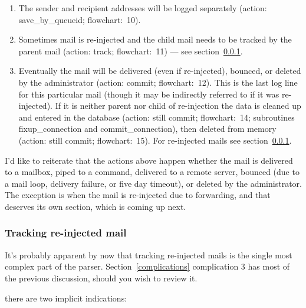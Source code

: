 \documentclass[a4paper,12pt,draft]{article}
\begin{document}
\begin{enumerate}

    \item The sender and recipient addresses will be logged separately
        (action: save\_by\_queueid; flowchart:~10).

    \item Sometimes mail is re-injected and the child mail needs to be
        tracked by the parent mail (action: track; flowchart:~11) --- see
        section~\ref{tracking-re-injected-mail}.

    \item Eventually the mail will be delivered (even if re-injected),
        bounced, or deleted by the administrator (action: commit;
        flowchart:~12).  This is the last log line for this particular mail
        (though it may be indirectly referred to if it was re-injected).
        If it is neither parent nor child of re-injection the data is
        cleaned up and entered in the database (action: still commit;
        flowchart:~14; subroutines fixup\_connection and
        commit\_connection), then deleted from memory (action: still
        commit; flowchart:~15).  For re-injected mails see
        section~\ref{tracking-re-injected-mail}.

\end{enumerate}

I'd like to reiterate that the actions above happen whether the mail is
delivered to a mailbox, piped to a command, delivered to a remote server,
bounced (due to a mail loop, delivery failure, or five day timeout), or
deleted by the administrator.  The exception is when the mail is
re-injected due to forwarding, and that deserves its own section, which is
coming up next.

\subsubsection{Tracking re-injected mail}

\label{tracking-re-injected-mail}

It's probably apparent by now that tracking re-injected mails is the single
most complex part of the parser.  Section~\ref{complications} complication
3 has most of the previous discussion, should you wish to review it.  

there are two implicit indications:
\end{document}
